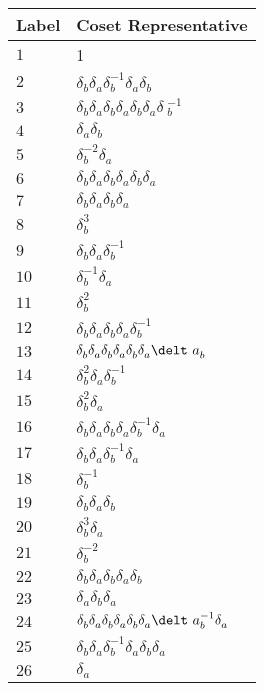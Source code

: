 \documentclass{article}
\begin{document}

\begin{center}
\begin{tabular}{ll}
\toprule
Label & Coset Representative\\
\midrule
$1$ & 1 \\
$2$ & $\delta_b^{}\delta_a^{}\delta_b^{-1}\delta_a^{}\delta_b^{}$ \\
$3$ & $\delta_b^{}\delta_a^{}\delta_b^{}\delta_a^{}\delta_b^{}\delta_a^{}\delta\
_b^{-1}$ \\
$4$ & $\delta_a^{}\delta_b^{}$ \\
$5$ & $\delta_b^{-2}\delta_a^{}$ \\
$6$ & $\delta_b^{}\delta_a^{}\delta_b^{}\delta_a^{}\delta_b^{}\delta_a^{}$ \\
$7$ & $\delta_b^{}\delta_a^{}\delta_b^{}\delta_a^{}$ \\
$8$ & $\delta_b^{3}$ \\
$9$ & $\delta_b^{}\delta_a^{}\delta_b^{-1}$ \\
$10$ & $\delta_b^{-1}\delta_a^{}$ \\
$11$ & $\delta_b^{2}$ \\
$12$ & $\delta_b^{}\delta_a^{}\delta_b^{}\delta_a^{}\delta_b^{-1}$ \\
$13$ & $\delta_b^{}\delta_a^{}\delta_b^{}\delta_a^{}\delta_b^{}\delta_a^{}\delt\
a_b^{}$ \\
$14$ & $\delta_b^{2}\delta_a^{}\delta_b^{-1}$ \\
$15$ & $\delta_b^{2}\delta_a^{}$ \\
$16$ & $\delta_b^{}\delta_a^{}\delta_b^{}\delta_a^{}\delta_b^{-1}\delta_a^{}$ \\
$17$ & $\delta_b^{}\delta_a^{}\delta_b^{-1}\delta_a^{}$ \\
$18$ & $\delta_b^{-1}$ \\
$19$ & $\delta_b^{}\delta_a^{}\delta_b^{}$ \\
$20$ & $\delta_b^{3}\delta_a^{}$ \\
$21$ & $\delta_b^{-2}$ \\
$22$ & $\delta_b^{}\delta_a^{}\delta_b^{}\delta_a^{}\delta_b^{}$ \\
$23$ & $\delta_a^{}\delta_b^{}\delta_a^{}$ \\
$24$ & $\delta_b^{}\delta_a^{}\delta_b^{}\delta_a^{}\delta_b^{}\delta_a^{}\delt\
a_b^{-1}\delta_a^{}$ \\
$25$ & $\delta_b^{}\delta_a^{}\delta_b^{-1}\delta_a^{}\delta_b^{}\delta_a^{}$ \\
$26$ & $\delta_a^{}$ \\

\end{tabular}
\end{center}
\end{document}
